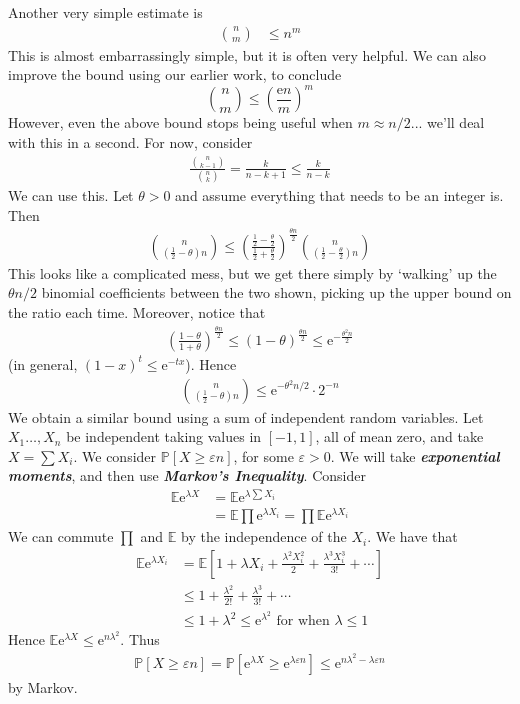 \documentclass[]{article}
\theoremstyle{custhm}
\theoremstyle{cusdef}
\theoremstyle{custhm}
\theoremstyle{custhm}
\theoremstyle{custhm}
\theoremstyle{custhm}
\theoremstyle{cusdef}
\theoremstyle{remark}
\theoremstyle{custhm}
\newcommand{\e}{\mathrm{e}}
\newcommand{\eps}{\varepsilon}
\newcommand{\E}{\mathbb{E}}
\renewcommand{\P}{\mathbb{P}}
\newcommand{\undf}[1]{\textit{\textbf{#1}}}
\begin{document}
Another very simple estimate is
\begin{align*}
\binom{n}{m}&\le n^m
\end{align*}
This is almost embarrassingly simple, but it is often very helpful. We can also improve the bound using our earlier work, to conclude
\[
\binom{n}{m} \le \left(\frac{\e n}{m}\right)^m
\]
However, even the above bound stops being useful when $m \approx n/2$... we'll deal with this in a second. For now, consider
\begin{align*}
\frac{\binom{n}{k-1}}{\binom{n}{k}} = \frac{k}{n-k+1}\le \frac{k}{n-k}
\end{align*}
We can use this. Let $\theta > 0$ and assume everything that needs to be an integer is. Then
\begin{align*}
\binom{n}{\left(\frac{1}{2} - \theta\right)n} \le \left(\frac{\frac{1}{2} - \frac{\theta}{2}}{\frac{1}{2}+\frac{\theta}{2}}\right)^{\frac{\theta n}{2}}\binom{n}{\left(\frac{1}{2} - \frac{\theta}{2}\right)n}
\end{align*}
This looks like a complicated mess, but we get there simply by `walking' up the $\theta n/2$ binomial coefficients between the two shown, picking up the upper bound on the ratio each time. Moreover, notice that
\begin{align*}
\left(\frac{1-\theta}{1+\theta}\right)^{\frac{\theta n}{2}} \le (1-\theta)^{\frac{\theta n}{2}} \le \e^{-\frac{\theta^2 n}{2}}
\end{align*}
(in general, $(1-x)^t \le \e^{-tx}$). Hence
\begin{align*}
\binom{n}{\left(\frac{1}{2}-\theta\right)n} \le \e^{-\theta^2 n/2}\cdot 2^{-n}
\end{align*}
We obtain a similar bound using a sum of independent random variables. Let $X_1\dots,X_n$ be independent taking values in $[-1,1]$, all of mean zero, and take $X = \sum X_i$. We consider $\P[X\ge \eps n]$, for some $\eps > 0$. We will take \undf{exponential moments}, and then use \undf{Markov's Inequality}. Consider
\begin{align*}
\E \e^{\lambda X} &= \E \e^{\lambda \sum X_i}\\
&=\E \prod \e^{\lambda X_i} = \prod \E\e^{\lambda X_i}
\end{align*}
We can commute $\prod$ and $\E$ by the independence of the $X_i$. We have that
\begin{align*}
\E \e^{\lambda X_i} &= \E\left[1 + \lambda X_i + \frac{\lambda^2X_i^2}{2} + \frac{\lambda^3X_i^3}{3!}+\cdots\right]\\
&\le 1 + \frac{\lambda^2}{2!} + \frac{\lambda^3}{3!}+\cdots\\
&\le 1 + \lambda^2 \le \e^{\lambda^2}\textrm{ for when }\lambda \le 1
\end{align*}
Hence $\E \e^{\lambda X} \le \e^{n\lambda^2}$. Thus
\begin{align*}
\P[X\ge \eps n] = \P[\e^{\lambda X}\ge \e^{\lambda \eps n}] \le \e^{n\lambda^2 - \lambda \eps n}
\end{align*}
by Markov.
\end{document}
